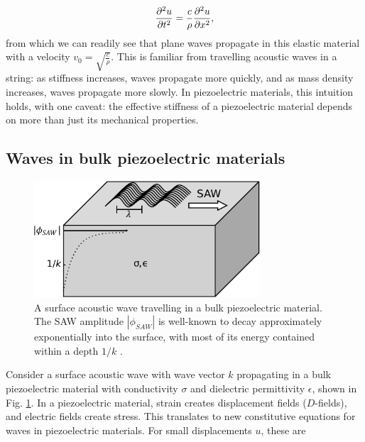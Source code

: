 \documentclass[double,12pt,1in]{beavtex}
\begin{document}
\begin{equation}
    \pdv[2]{u}{t} = \frac{c}{\rho} \pdv[2]{u}{x},
\end{equation}
from which we can readily see that plane waves propagate in this elastic material with a velocity $v_0 = \sqrt{\frac{c}{\rho}}$. This is familiar from travelling acoustic waves in a string: as stiffness increases, waves propagate more quickly, and as mass density increases, waves propagate more slowly. In piezoelectric materials, this intuition holds, with one caveat: the effective stiffness of a piezoelectric material depends on more than just its mechanical properties.

\subsection{Waves in bulk piezoelectric materials}
\begin{figure}
    \includegraphics[width=0.75\textwidth]{SAW in bulk semi.pdf}
    \caption{A surface acoustic wave travelling in a bulk piezoelectric material. The SAW amplitude $|\phi_{SAW}|$ is well-known to decay approximately exponentially into the surface, with most of its energy contained within a depth $1/k$ \cite{wixforth_surface_1989}.}
    \label{SAWbulksemi}
\end{figure}

Consider a surface acoustic wave with wave vector $k$ propagating in a bulk piezoelectric material with conductivity $\sigma$ and dielectric permittivity $\epsilon$, shown in Fig. \ref{SAWbulksemi}. In a piezoelectric material, strain creates displacement fields ($D$-fields), and electric fields create stress. This translates to new constitutive equations for waves in piezoelectric materials. For small displacements $u$, these are
\end{document}
